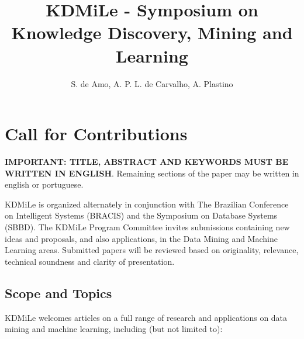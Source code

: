 \documentclass[kdmile,a4paper]{kdmile} %
\title{KDMiLe - Symposium on Knowledge Discovery, Mining and Learning\\}
\author{S. de Amo\inst{1}, A. P. L. de Carvalho\inst{2}, A. Plastino\inst{3}}
\institute{Universidade Federal de Uberl\^andia, Brazil \\ \email{deamo@ufu.br}
\and Universidade de S\~ao Paulo, Brazil  \\ \email{andre@icmc.usp.br}
\and Universidade Federal Fluminense, Brazil  \\ \email{plastino@ic.uff.br}
}
\begin{document}
\begin{bottomstuff}
\end{bottomstuff}

\maketitle


\section{Call for Contributions}

\textbf{IMPORTANT: TITLE, ABSTRACT AND KEYWORDS MUST BE WRITTEN IN ENGLISH}. Remaining sections of the paper may be written in english or portuguese.


KDMiLe is organized alternately in conjunction with The Brazilian Conference on Intelligent Systems (BRACIS) and the Symposium on Database Systems (SBBD). The KDMiLe Program Committee invites submissions containing new ideas and proposals, and also applications, in the Data Mining and Machine Learning areas. Submitted papers will be reviewed based on originality, relevance, technical soundness and clarity of presentation. 

\subsection{Scope and Topics}

KDMiLe welcomes articles on a full range of research and applications on data mining and machine learning, including (but not limited to):

\end{document}
